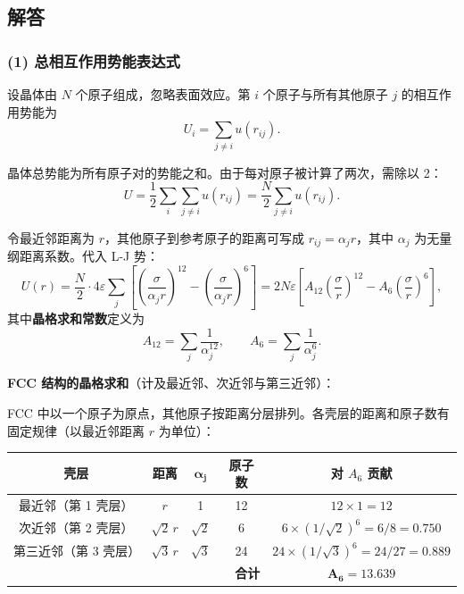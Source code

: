 \subsection{解答}

\subsubsection{(1) 总相互作用势能表达式}

设晶体由 $N$ 个原子组成，忽略表面效应。第 $i$ 个原子与所有其他原子 $j$ 的相互作用势能为
\[
  U_i = \sum_{j\neq i} u(r_{ij}) .
\]

晶体总势能为所有原子对的势能之和。由于每对原子被计算了两次，需除以 2：
\[
  U = \frac{1}{2}\sum_{i}\sum_{j\neq i} u(r_{ij}) = \frac{N}{2}\sum_{j\neq i} u(r_{ij}) .
\tag{1}
\]

令最近邻距离为 $r$，其他原子到参考原子的距离可写成 $r_{ij} = \alpha_j r$，其中 $\alpha_j$ 为无量纲距离系数。代入 L-J 势：
\[
  U(r) = \frac{N}{2} \cdot 4\varepsilon\sum_{j}\left[\left(\frac{\sigma}{\alpha_j r}\right)^{12} - \left(\frac{\sigma}{\alpha_j r}\right)^{6}\right]
       = 2N\varepsilon\left[A_{12}\left(\frac{\sigma}{r}\right)^{12} - A_{6}\left(\frac{\sigma}{r}\right)^{6}\right] ,
\tag{2}
\]
其中\textbf{晶格求和常数}定义为
\[
  A_{12} = \sum_{j}\frac{1}{\alpha_j^{12}}, \qquad
  A_{6}  = \sum_{j}\frac{1}{\alpha_j^{6}} .
\tag{3}
\]

\textbf{FCC 结构的晶格求和}（计及最近邻、次近邻与第三近邻）：

FCC 中以一个原子为原点，其他原子按距离分层排列。各壳层的距离和原子数有固定规律（以最近邻距离 $r$ 为单位）：

\begin{center}
\renewcommand{\arraystretch}{1.4}
\begin{tabular}{|c|c|c|c|c|}
\hline
\textbf{壳层} & \textbf{距离} & $\boldsymbol{\alpha_j}$ & \textbf{原子数} & \textbf{对 $A_6$ 贡献} \\
\hline
最近邻（第 1 壳层）   & $r$         & 1         & 12 & $12\times 1 = 12$ \\
次近邻（第 2 壳层）   & $\sqrt{2}\,r$ & $\sqrt{2}$ & 6  & $6\times(1/\sqrt{2})^6 = 6/8 = 0.750$ \\
第三近邻（第 3 壳层） & $\sqrt{3}\,r$ & $\sqrt{3}$ & 24 & $24\times(1/\sqrt{3})^6 = 24/27 = 0.889$ \\
\hline
\multicolumn{4}{|r|}{\textbf{合计}} & $\bm{A_6 = 13.639}$ \\
\hline
\end{tabular}
\end{center}

